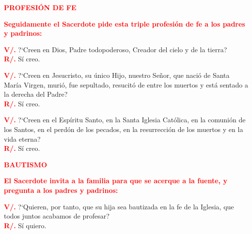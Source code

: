 \documentclass[12pt, letterpaper]{report}
\begin{document}
\Large {\bfseries \textcolor{red}{PROFESI\'ON DE FE}} \newline

\large {\bfseries \textcolor{red}{Seguidamente el Sacerdote pide esta triple profesi\'on de fe a los padres y padrinos:}} \newline

\noindent
\Large {\bfseries \textcolor{red}{V/.}} \hspace{0.5cm} ?`Creen en Dios, Padre todopoderoso, Creador del cielo y de la tierra? \\
\Large {\bfseries \textcolor{red}{R/.}} \hspace{0.5cm} S\'i creo. \newline

\noindent
\Large {\bfseries \textcolor{red}{V/.}} \hspace{0.5cm} ?`Creen en Jesucristo, su \'unico Hijo, nuestro Se\~nor, que naci\'o de Santa Mar\'ia Virgen, muri\'o, fue sepultado, resucit\'o de entre los muertos y est\'a sentado a la derecha del Padre? \\
\Large {\bfseries \textcolor{red}{R/.}} \hspace{0.5cm} S\'i creo. \newline

\noindent
\Large {\bfseries \textcolor{red}{V/.}} \hspace{0.5cm} ?`Creen en el Esp\'iritu Santo, en la Santa Iglesia Cat\'olica, en la comuni\'on de los Santos, en el perd\'on de los pecados, en la resurrecci\'on de los muertos y en la vida eterna? \\
\Large {\bfseries \textcolor{red}{R/.}} \hspace{0.5cm} S\'i creo. \newline

\newpage

\Large {\bfseries \textcolor{red}{BAUTISMO}} \newline

\large {\bfseries \textcolor{red}{El Sacerdote invita a la familia para que se acerque a la fuente, y pregunta a los padres y padrinos:}} \newline

\noindent
\Large {\bfseries \textcolor{red}{V/.}} \hspace{0.5cm} ?`Quieren, por tanto, que su hija sea bautizada en la fe de la Iglesia, que todos juntos acabamos de profesar? \\
\Large {\bfseries \textcolor{red}{R/.}} \hspace{0.5cm} S\'i quiero. \newline
\end{document}
